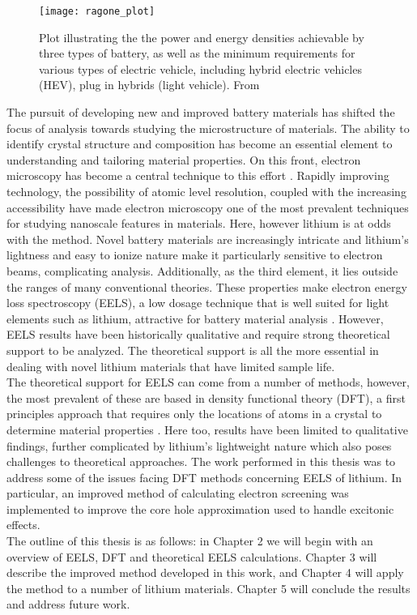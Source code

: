 \begin{figure}
	\centering
	\texttt{[image: ragone\_plot]}
	\caption{Plot illustrating the the power and energy densities achievable by three types of battery, as well as the minimum requirements for various types of electric vehicle, including hybrid electric vehicles (HEV), plug in hybrids (light vehicle). From \cite{etacheri_challenges_2011} }
	\label{ragone}
	
\end{figure}
The pursuit of developing new and improved battery materials has shifted the focus of analysis towards studying the microstructure of materials. The ability to identify crystal structure and composition has become an essential element to understanding and tailoring material properties.  On this front, electron microscopy has become a central technique to this effort  \cite{inkson_2_2016}.  Rapidly improving technology, the possibility of atomic level resolution, coupled with the increasing accessibility have made electron microscopy one of the most prevalent techniques for studying nanoscale features in materials.  Here, however lithium is at odds with the method.  Novel battery materials are increasingly intricate and lithium's lightness and easy to ionize nature make it particularly sensitive to electron beams, complicating analysis.  Additionally, as the third element, it lies outside the ranges of many conventional theories.  These properties make electron energy loss spectroscopy (EELS), a low dosage technique that is well suited for light elements such as lithium, attractive for battery material analysis   \cite{Egerton}.  However, EELS results have been historically qualitative and require strong theoretical support to be analyzed.  The theoretical support is all the more essential in dealing with novel lithium materials that have limited sample life.   
\\
The theoretical support for EELS can come from a number of methods, however, the most prevalent of these are based in density functional theory (DFT), a first principles approach that requires only the locations of atoms in a crystal to determine material properties \cite{ks_1965}.  Here too, results have been limited to qualitative findings, further complicated by lithium's lightweight nature which also poses challenges to theoretical approaches.  The work performed in this thesis was to address some of the issues facing DFT methods concerning EELS of lithium.  In particular, an improved method of calculating electron screening was implemented to improve the core hole approximation used to handle excitonic effects.  
\\

The outline of this thesis is as follows: in Chapter 2 we will begin with an overview of EELS, DFT and theoretical EELS calculations.  Chapter 3 will describe the improved method developed in this work, and Chapter 4 will apply the method to a number of lithium materials.  Chapter 5 will conclude the results and address future work.


